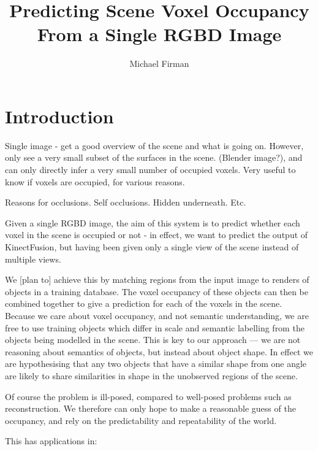 \documentclass[10pt,a4paper]{article}
\title{Predicting Scene Voxel Occupancy From a Single RGBD Image}
\author{Michael Firman}
\begin{document}
\maketitle




\section{Introduction}

Single image - get a good overview of the scene and what is going on. However, only see a very small subset of the surfaces in the scene. (Blender image?), and can only directly infer a very small number of occupied voxels. 
Very useful to know if voxels are occupied, for various reasons.

Reasons for occlusions. Self occlusions. Hidden underneath. Etc.

Given a single RGBD image, the aim of this system is to predict whether each voxel in the scene is occupied or not - in effect, we want to predict the output of KinectFusion, but having been given only a single view of the scene instead of multiple views.

We [plan to] achieve this by matching regions from the input image to renders of objects in a training database.
The voxel occupancy of these objects can then be combined together to give a prediction for each of the voxels in the scene. 
Because we care about voxel occupancy, and not semantic understanding, we are free to use training objects which differ in scale and semantic labelling from the objects being modelled in the scene. 
This is key to our approach --- we are not reasoning about semantics of objects, but instead about object shape.
In effect we are hypothesising that any two objects that have a similar shape from one angle are likely to share similarities in shape in the unobserved regions of the scene.

Of course the problem is ill-posed, compared to well-posed problems such as reconstruction. 
We therefore can only hope to make a reasonable guess of the occupancy, and rely on the predictability and repeatability of the world.


This has applications in:
\end{document}
